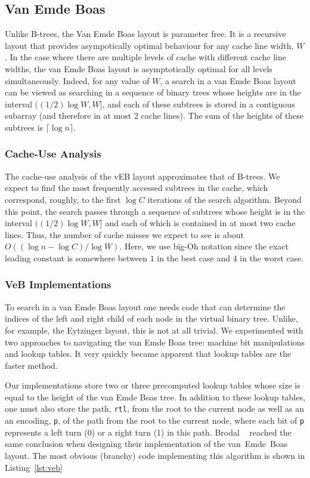 \documentclass{patmorin}
\newcommand{\lstref}[1]{Listing~\ref{lst:#1}}
\begin{document}
\subsection{Van Emde Boas}

Unlike B-trees, the Van Emde Boas layout is parameter free.  It is a
recursive layout that provides asympotically optimal behaviour for any
cache line width, $W$.  In the case where there are multiple levels
of cache with different cache line widths, the van Emde Boas layout
is asymptotically optimal for all levels simultaneously.  Indeed, for
any value of $W$, a search in a van Emde Boas layout can be viewed
as searching in a sequence of binary trees whose heights are in the
interval $((1/2)\log W,W]$, and each of these subtrees is stored in a
contiguous subarray (and therefore in at most 2 cache lines).  The sum
of the heights of these subtrees is $\lceil\log n\rceil$.


\subsubsection{Cache-Use Analysis}

The cache-use analysis of the vEB layout approximates that of B-trees.
We expect to find the most frequently accessed subtrees in the cache,
which correspond, roughly, to the first $\log C$ iterations of the search
algorithm.  Beyond this point, the search passes through a sequence of
subtrees whose height is in the interval $((1/2)\log W,W]$ and each of
which is contained in at most two cache lines.  Thus, the number of cache
misses we expect to see is about $O((\log n - \log C)/\log W)$.  Here,
we use big-Oh notation since the exact leading constant is somewhere
between $1$ in the best case and $4$ in the worst case.

\subsubsection{VeB Implementations}

To search in a van Emde Boas layout one needs code that can determine
the indices of the left and right child of each node in the virtual
binary tree.  Unlike, for example, the Eytzinger layout, this is not at
all trivial. We experimented with two approaches to navigating the van
Emde Boas tree: machine bit manipulations and lookup tables.  It very
quickly became apparent that lookup tables are the faster method.

Our implementations store two or three precomputed lookup tables whose
size is equal to the height of the van Emde Boas tree. In addition to
these lookup tables, one must also store the path, \texttt{rtl},
from the root to the current node as well as an an encoding,
\texttt{p}, of the path from the root to the current node, where
each bit of \texttt{p} represents a left turn (0) or a right
turn (1) in this path.  Brodal \etal\ \cite{brodal.fagerberg.ea:cache}
reached the same conclusion when designing their implementation of the
van~Emde~Boas layout.  The most obvious (branchy) code implementing this
algorithm is shown in \lstref{veb}
\end{document}
